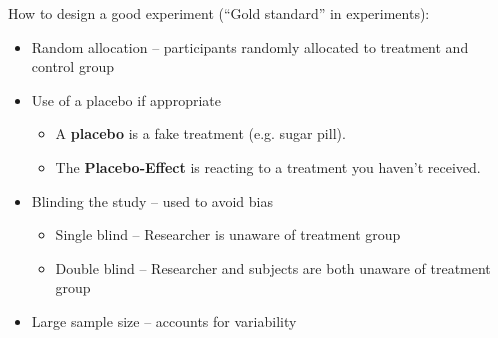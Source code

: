 \documentclass[../mathNotesPreamble]{subfiles}
\begin{document}
  How to design a good experiment (``Gold standard'' in experiments):
  \begin{itemize}
    \item Random allocation -- participants randomly allocated to treatment and control group
    \item Use of a placebo if appropriate
      \begin{itemize}
        \item A \textbf{placebo} is a fake treatment (e.g. sugar pill).
        \item The \textbf{Placebo-Effect} is reacting to a treatment you haven't received.
      \end{itemize}
    \item Blinding the study  -- used to avoid bias
      \begin{itemize}
        \item Single blind -- Researcher is unaware of treatment group
        \item Double blind -- Researcher and subjects are both unaware of treatment group
      \end{itemize}
    \item Large sample size -- accounts for variability
  \end{itemize}
  \pagebreak
\end{document}
